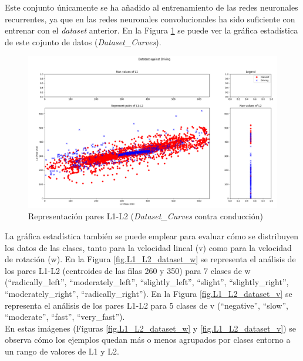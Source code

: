 Este conjunto únicamente se ha añadido al entrenamiento de las redes neuronales recurrentes, ya que en las redes neuronales convolucionales ha sido suficiente con entrenar con el \textit{dataset} anterior. En la Figura \ref{fig.L1_L2_dataset_curves} se puede ver la gráfica estadística de este cojunto de datos (\textit{Dataset\_Curves}).\\

\begin{figure}
  \begin{center}
    \includegraphics[width=1\textwidth]{figures/Infraestructura/L1_L2_Dataset_Curves.png}
		\caption{Representación pares L1-L2 (\textit{Dataset\_Curves} contra conducción)}
		\label{fig.L1_L2_dataset_curves}
		\end{center}
\end{figure}

La gráfica estadística también se puede emplear para evaluar cómo se distribuyen los datos de las clases, tanto para la velocidad lineal (v) como para la velocidad de rotación (w). En la Figura \ref{fig.L1_L2_dataset_w} se representa el análisis de los pares L1-L2 (centroides de las filas 260 y 350) para 7 clases de w (``radically\_left'', ``moderately\_left'', ``slightly\_left'', ``slight'', ``slightly\_right'', ``moderately\_right'', ``radically\_right''). En la Figura \ref{fig.L1_L2_dataset_v} se representa el análisis de los pares L1-L2 para 5 clases de v (``negative'', ``slow'', ``moderate'', ``fast'', ``very\_fast''). \\

En estas imágenes (Figuras \ref{fig.L1_L2_dataset_w} y \ref{fig.L1_L2_dataset_v}) se observa cómo los ejemplos quedan más o menos agrupados por clases entorno a un rango de valores de L1 y L2. \\

